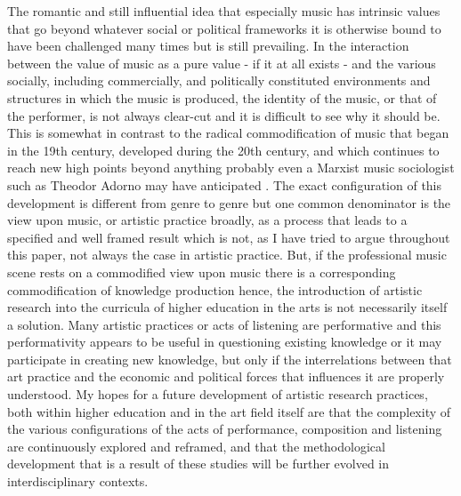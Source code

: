 \documentclass[11pt]{article}
\begin{document}
The romantic and still influential idea that especially music
has intrinsic values that go beyond whatever social or political
frameworks it is otherwise bound to have been challenged many times but
is still prevailing. In the interaction between the value of music as
a pure value - if it at all exists -  and the various socially,
including commercially, and politically constituted environments and
structures in which the music is produced, the identity of the music,
or that of the performer, is not always clear-cut and it is difficult
to see why it should be. This is somewhat in
contrast to the radical commodification of music that began in the 19th century,
developed during the 20th century, and which continues to reach new high
points beyond anything probably even a Marxist music sociologist such as
Theodor Adorno may have anticipated \citep[see e.g.][]{adorno76}. The exact configuration of this development is different from genre to
genre but one common denominator is the view upon music, or artistic
practice broadly, as a process that leads to a specified and well
framed result which
is not, as I have tried to argue throughout this paper, not always the case in
artistic practice. But, if the professional music scene
rests on a commodified view upon music there is a corresponding
commodification of knowledge production \citep[p. 2]{Busch2009} hence, the
introduction of artistic research into the curricula of higher
education in the arts is not necessarily itself a solution.
Many artistic practices or acts of
listening are performative and this performativity appears to be
useful in questioning 
existing knowledge or it may participate in creating new knowledge, but only if
the interrelations between that art practice and the economic and
political forces that influences it are properly understood.
My hopes for a future development of artistic research practices,
both within higher education and in the art field itself are that the
complexity of the various configurations of the acts of performance,
composition and listening are continuously explored and reframed, and that the 
methodological development that is a result of these studies will
be further evolved in interdisciplinary contexts. 


\end{document}
